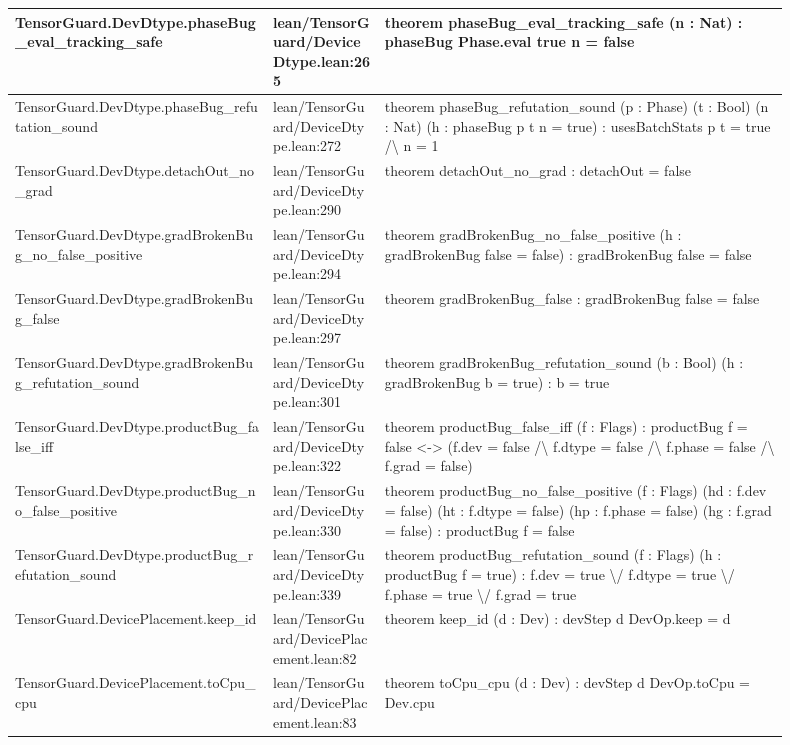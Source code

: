 \documentclass[10pt]{article}
\begin{document}
\begin{longtable}{|p{0.30\linewidth}|p{0.13\linewidth}|p{0.47\linewidth}|}
\hline
TensorGuard.DevDtype.phaseBug\_eval\_tracking\_safe & lean/TensorGuard/DeviceDtype.lean:265 & theorem phaseBug\_eval\_tracking\_safe (n : Nat) : phaseBug Phase.eval true n = false \\
\hline
TensorGuard.DevDtype.phaseBug\_refutation\_sound & lean/TensorGuard/DeviceDtype.lean:272 & theorem phaseBug\_refutation\_sound (p : Phase) (t : Bool) (n : Nat) (h : phaseBug p t n = true) : usesBatchStats p t = true /\textbackslash{} n = 1 \\
\hline
TensorGuard.DevDtype.detachOut\_no\_grad & lean/TensorGuard/DeviceDtype.lean:290 & theorem detachOut\_no\_grad : detachOut = false \\
\hline
TensorGuard.DevDtype.gradBrokenBug\_no\_false\_positive & lean/TensorGuard/DeviceDtype.lean:294 & theorem gradBrokenBug\_no\_false\_positive (h : gradBrokenBug false = false) : gradBrokenBug false = false \\
\hline
TensorGuard.DevDtype.gradBrokenBug\_false & lean/TensorGuard/DeviceDtype.lean:297 & theorem gradBrokenBug\_false : gradBrokenBug false = false \\
\hline
TensorGuard.DevDtype.gradBrokenBug\_refutation\_sound & lean/TensorGuard/DeviceDtype.lean:301 & theorem gradBrokenBug\_refutation\_sound (b : Bool) (h : gradBrokenBug b = true) : b = true \\
\hline
TensorGuard.DevDtype.productBug\_false\_iff & lean/TensorGuard/DeviceDtype.lean:322 & theorem productBug\_false\_iff (f : Flags) : productBug f = false <-> (f.dev = false /\textbackslash{} f.dtype = false /\textbackslash{} f.phase = false /\textbackslash{} f.grad = false) \\
\hline
TensorGuard.DevDtype.productBug\_no\_false\_positive & lean/TensorGuard/DeviceDtype.lean:330 & theorem productBug\_no\_false\_positive (f : Flags) (hd : f.dev = false) (ht : f.dtype = false) (hp : f.phase = false) (hg : f.grad = false) : productBug f = false \\
\hline
TensorGuard.DevDtype.productBug\_refutation\_sound & lean/TensorGuard/DeviceDtype.lean:339 & theorem productBug\_refutation\_sound (f : Flags) (h : productBug f = true) : f.dev = true \textbackslash{}/ f.dtype = true \textbackslash{}/ f.phase = true \textbackslash{}/ f.grad = true \\
\hline
TensorGuard.DevicePlacement.keep\_id & lean/TensorGuard/DevicePlacement.lean:82 & theorem keep\_id (d : Dev) : devStep d DevOp.keep = d \\
\hline
TensorGuard.DevicePlacement.toCpu\_cpu & lean/TensorGuard/DevicePlacement.lean:83 & theorem toCpu\_cpu (d : Dev) : devStep d DevOp.toCpu = Dev.cpu \\

\end{longtable}
\end{document}
